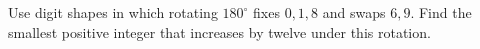Use digit shapes in which rotating $180^\circ$ fixes $0,1,8$ and swaps $6,9$. Find the smallest positive integer that increases by twelve under this rotation.
